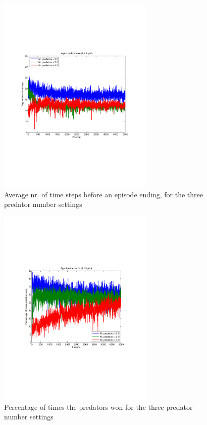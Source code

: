 \begin{figure}[htb]
\centering
\includegraphics[bb = 0.6in 2.9in 7.9in 8.2in,clip,width=0.66\textwidth]
{IQLgrid9by9nrTimeSteps5000episodesavg200trials.pdf} 
\caption{Average nr. of time steps before an episode ending, for the three predator number settings}
\label{fig:IQLnrTimeSteps}
\end{figure}
\begin{figure}[htb]
\centering
\includegraphics[bb = 0.6in 3in 7.9in 8in,clip,width=0.66\textwidth]
{IQLgrid9by9percentageWinning5000episodesavg200trials.pdf} 
\caption{Percentage of times the predators won for the three predator number settings}
\label{fig:IQLpercentagePlot}
\end{figure}



